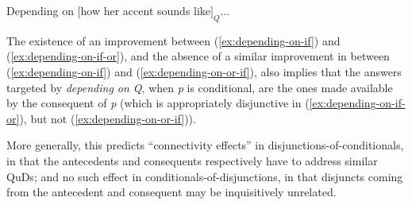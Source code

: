 \begin{exe}
	\ex\label{ex:depending-on} Depending on $[$how her accent sounds like$]_{Q}$...
	\begin{xlist}
		\label{ex:depending-on-or}
		 \label{ex:depending-on-if}
		\label{ex:depending-on-if-or}
		\label{ex:depending-on-or-if}
	\end{xlist}
\end{exe}


The existence of an improvement between (\ref{ex:depending-on-if}) and (\ref{ex:depending-on-if-or}), and the absence of a similar improvement in between (\ref{ex:depending-on-if}) and (\ref{ex:depending-on-or-if}), also implies that the answers targeted by \textit{depending on Q}, when \textit{p} is conditional, are the ones made available by the consequent of \textit{p} (which is appropriately disjunctive in (\ref{ex:depending-on-if-or}), but not (\ref{ex:depending-on-or-if})).




More generally, this predicts ``connectivity effects'' in disjunctions-of-conditionals, in that the antecedents and consequents respectively have to address similar QuDs; and no such effect in conditionals-of-disjunctions, in that disjuncts coming from the antecedent and consequent may be inquisitively unrelated.